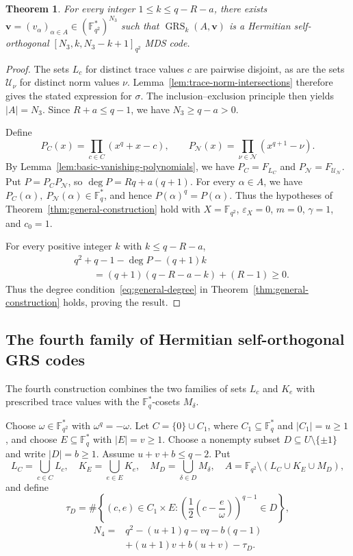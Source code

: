 \documentclass[preprint,12pt,a4paper]{elsarticle}
\newtheorem{theorem}{Theorem}[section]
\newcommand{\GRS}{\operatorname{GRS}}
\begin{document}
\begin{theorem}\label{thm:third-grs}
For every integer $1\le k\le q-R-a$, there exists $\boldsymbol v=(v_\alpha)_{\alpha\in A}\in (\mathbb F_{q^2}^{*})^{N_3}$ such that $\GRS_k(A,\boldsymbol v)$ is a Hermitian self-orthogonal $[N_3,k,N_3-k+1]_{q^2}$ MDS code.
\end{theorem}

\begin{proof}
The sets $L_c$ for distinct trace values $c$ are pairwise disjoint, as are the sets $\mathcal U_\nu$ for distinct norm values $\nu$. Lemma~\ref{lem:trace-norm-intersections} therefore gives the stated expression for $\sigma$. The inclusion--exclusion principle then yields $|A|=N_3$. Since $R+a\le q-1$, we have $N_3\ge q-a>0$.

Define
\[
 P_C(x)=\prod_{c\in C}(x^q+x-c),
 \qquad
 P_{\mathcal N}(x)=\prod_{\nu\in\mathcal N}(x^{q+1}-\nu).
\]
By Lemma~\ref{lem:basic-vanishing-polynomials}, we have $P_C=F_{L_C}$ and $P_{\mathcal N}=F_{\mathcal U_{\mathcal N}}$. Put $P=P_CP_{\mathcal N}$, so $\deg P=Rq+a(q+1)$. For every $\alpha\in A$, we have $P_C(\alpha),\ P_{\mathcal N}(\alpha)\in\mathbb F_q^{*}$, and hence $P(\alpha)^q=P(\alpha)$. Thus the hypotheses of Theorem~\ref{thm:general-construction} hold with $X=\mathbb F_{q^2}$, $\varepsilon_X=0$, $m=0$, $\gamma=1$, and $c_0=1$.

For every positive integer $k$ with $k\le q-R-a$,
\[
\begin{aligned}
 &q^2+q-1-\deg P-(q+1)k\\
 &\qquad=(q+1)(q-R-a-k)+(R-1)\ge0.
\end{aligned}
\]
Thus the degree condition~\eqref{eq:general-degree} in Theorem~\ref{thm:general-construction} holds, proving the result.
\end{proof}

\subsection{The fourth family of Hermitian self-orthogonal GRS codes}

The fourth construction combines the two families of sets $L_c$ and $K_e$ with prescribed trace values with the $\mathbb F_q^{*}$-cosets $M_\delta$.

Choose $\omega\in\mathbb F_{q^2}^{*}$ with $\omega^q=-\omega$. Let $C=\{0\}\cup C_1$, where $C_1\subseteq\mathbb F_q^{*}$ and $|C_1|=u\ge1$, and choose $E\subseteq\mathbb F_q^{*}$ with $|E|=v\ge1$. Choose a nonempty subset $D\subseteq U\setminus\{\pm1\}$ and write $|D|=b\ge1$. Assume $u+v+b\le q-2$. Put
\[
 L_C=\bigcup_{c\in C}L_c,
 \quad
 K_E=\bigcup_{e\in E}K_e,
 \quad
 M_D=\bigcup_{\delta\in D}M_\delta,
 \quad
 A=\mathbb F_{q^2}\setminus(L_C\cup K_E\cup M_D),
\]
and define
\[
 \tau_D
 =\#\left\{(c,e)\in C_1\times E:
 \left(\frac12\left(c-\frac e\omega\right)\right)^{q-1}\in D\right\},
\]
\[
 \begin{aligned}
 N_4={}&q^2-(u+1)q-vq-b(q-1)\\
       &+(u+1)v+b(u+v)-\tau_D.
\end{aligned}
\]
\end{document}
